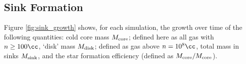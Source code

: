 \subsection{Sink Formation}
\label{subsec:sink_formation}

Figure \ref{fig:sink_growth} shows, for each simulation, the growth over time of the following quantities: cold core mass $M_{\rm \small core}$; defined here as all gas with $n \geq 100\cc$, `disk' mass $M_{\rm \small disk}$; defined as gas above $n=10^8\cc$, total mass in sinks $M_{\rm \small sink}$, and the star formation efficiency (defined as $M_{\rm \small core}/M_{\rm \small core}$).
